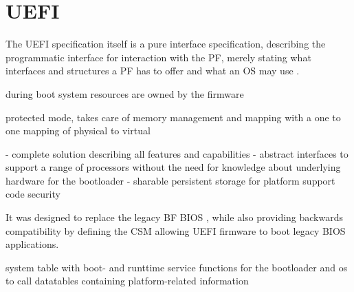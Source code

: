 
\section{\acf{UEFI}}

The \ac{UEFI} specification itself is a pure interface specification, describing the programmatic interface for interaction with the \ac{PF}, merely stating what interfaces and structures a \ac{PF} has to offer and what an \ac{OS} may use \cite{beyond-bios}.

during boot system resources are owned by the firmware

protected mode, takes care of memory management and mapping with a one to one mapping of physical to virtual


- complete solution describing all features and capabilities
- abstract interfaces to support a range of processors without the need for knowledge about underlying hardware for the bootloader
- sharable persistent storage for platform support code
security






\cite[2.3.4]{uefi-spec}

It was designed to replace the legacy \acl{BF} \ac{BIOS} , while also providing backwards compatibility by defining the \acf{CSM} allowing \ac{UEFI} firmware to boot legacy \ac{BIOS} applications.

system table with boot- and runttime service functions for the bootloader and os to call
datatables containing platform-related information

